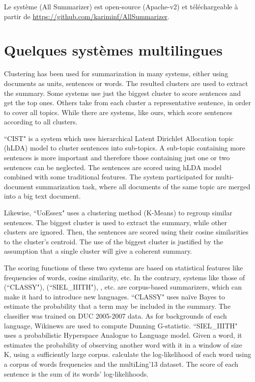 \documentclass[12pt, oneside, a4paper]{book}
\begin{document}
Le système (All Summarizer) est open-source (Apache-v2) et téléchargeable à partir de \url{https://github.com/kariminf/AllSummarizer}.


\section{Quelques systèmes multilingues}

Clustering has been used for summarization in many systems, either using documents as units, sentences or words. 
The resulted clusters are used to extract the summary.
Some systems use just the biggest cluster to score sentences and get the top ones. 
Others take from each cluster a representative sentence, in order to cover all topics. 
While there are systems, like ours, which score sentences according to all clusters.

``CIST" \cite{11-liu-al,13-li-al} is a system which uses hierarchical Latent Dirichlet Allocation topic (hLDA) model to cluster sentences into sub-topics.
A sub-topic containing more sentences is more important and therefore those containing just one or two sentences can be neglected.
The sentences are scored using hLDA model combined with some traditional features. 
The system participated for multi-document summarization task, where all documents of the same topic are merged into a big text document.

Likewise, ``UoEssex" \cite{11-elhaj-al} uses a clustering method (K-Means) to regroup similar sentences.
The biggest cluster is used to extract the summary, while other clusters are ignored. 
Then, the sentences are scored using their cosine similarities to the cluster's centroid. 
The use of the biggest cluster is justified by the assumption that a single cluster will give a coherent summary.

The scoring functions of these two systems are based on statistical features like frequencies of words, cosine similarity, etc.
In the contrary, systems like those of \cite{11-conroy-al} (``CLASSY"), \cite{11-varma-al} (``SIEL\_IIITH"), \cite{13-elhaj-rayson}, etc. are corpus-based summarizers, which can make it hard to introduce new languages.
``CLASSY" uses na\"ive Bayes to estimate the probability that a term may be included in the summary. 
The classifier was trained on DUC 2005-2007 data. 
As for backgrounds of each language, Wikinews are used to compute Dunning G-statistic.
``SIEL\_IIITH" uses a probabilistic Hyperspace Analogue to Language model. 
Given a word, it estimates the probability of observing another word with it in a window of size K, using a sufficiently large corpus. 
\cite{13-elhaj-rayson} calculate the log-likelihood of each word using a corpus of words frequencies and the multiLing'13 dataset. 
The score of each sentence is the sum of its words' log-likelihoods.
\end{document}
